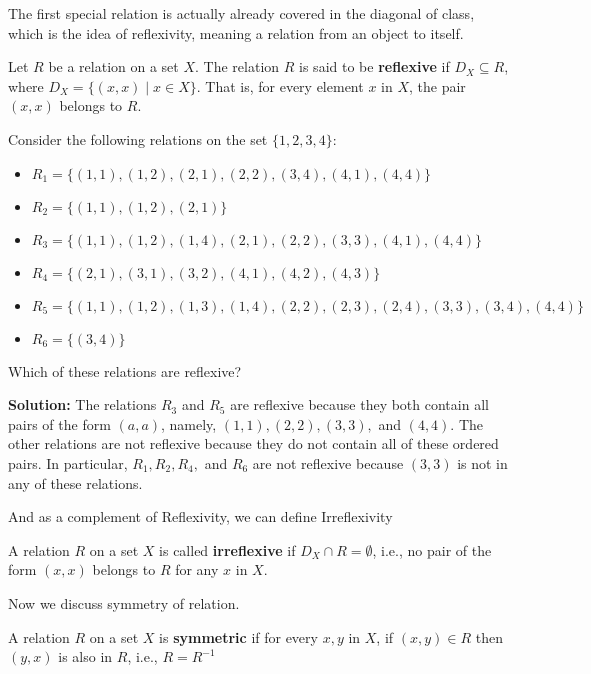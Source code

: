 The first special relation is actually already covered in the diagonal of class, which is the idea of reflexivity, meaning a relation from an object to itself.
\begin{definition}\label{reflexR}
	Let \( R \) be a relation on a set \( X \). The relation \( R \) is said to be \textbf{reflexive} if \( D_X \subseteq R \), where \( D_X = \{(x, x) \mid x \in X\} \). That is, for every element \( x \) in \( X \), the pair \( (x, x) \) belongs to \( R \).
\end{definition}
\begin{example}
	Consider the following relations on the set \(\{1, 2, 3, 4\}\):
	
	\begin{itemize}
		\item \( R_1 = \{(1, 1), (1, 2), (2, 1), (2, 2), (3, 4), (4, 1), (4, 4)\} \)
		\item \( R_2 = \{(1, 1), (1, 2), (2, 1)\} \)
		\item \( R_3 = \{(1, 1), (1, 2), (1, 4), (2, 1), (2, 2), (3, 3), (4, 1), (4, 4)\} \)
		\item \( R_4 = \{(2, 1), (3, 1), (3, 2), (4, 1), (4, 2), (4, 3)\} \)
		\item \( R_5 = \{(1, 1), (1, 2), (1, 3), (1, 4), (2, 2), (2, 3), (2, 4), (3, 3), (3, 4), (4, 4)\} \)
		\item \( R_6 = \{(3, 4)\} \)
	\end{itemize}
	
	Which of these relations are reflexive?
	
	\textbf{Solution:} The relations \( R_3 \) and \( R_5 \) are reflexive because they both contain all pairs of the form \( (a, a) \), namely, \( (1, 1), (2, 2), (3, 3), \) and \( (4, 4) \). The other relations are not reflexive because they do not contain all of these ordered pairs. In particular, \( R_1, R_2, R_4, \) and \( R_6 \) are not reflexive because \( (3, 3) \) is not in any of these relations.
\end{example}
And as a complement of Reflexivity, we can define Irreflexivity
\begin{definition}
	A relation \( R \) on a set \( X \) is called \textbf{irreflexive} if \( D_X \cap R = \emptyset \), i.e., no pair of the form \( (x, x) \) belongs to \( R \) for any \( x \) in \( X \).
\end{definition}

Now we discuss symmetry of relation.
\begin{definition}
	A relation \( R \) on a set \( X \) is \textbf{symmetric} if for every \( x, y \) in \( X \), if \( (x, y) \in R \) then \( (y, x) \) is also in \( R \), i.e., $R = R^{-1}$
\end{definition}

